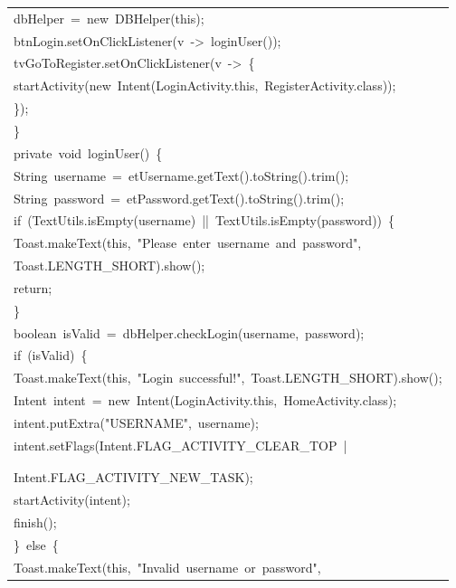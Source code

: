 \documentclass[a4paper,12pt]{article}
\begin{document}
\begin{longtable}{|p{}|}
{\ttfamily\small dbHelper\ =\ new\ DBHelper(this);} \\
{\ttfamily\small btnLogin.setOnClickListener(v\ -\textgreater{}\ loginUser());} \\
{\ttfamily\small tvGoToRegister.setOnClickListener(v\ -\textgreater{}\ \{} \\
{\ttfamily\small startActivity(new\ Intent(LoginActivity.this,\ RegisterActivity.class));} \\
{\ttfamily\small \});} \\
{\ttfamily\small \}} \\
{\ttfamily\small private\ void\ loginUser()\ \{} \\
{\ttfamily\small String\ username\ =\ etUsername.getText().toString().trim();} \\
{\ttfamily\small String\ password\ =\ etPassword.getText().toString().trim();} \\
{\ttfamily\small if\ (TextUtils.isEmpty(username)\ ||\ TextUtils.isEmpty(password))\ \{} \\
{\ttfamily\small Toast.makeText(this,\ "Please\ enter\ username\ and\ password",} \\
{\ttfamily\small Toast.LENGTH\_SHORT).show();} \\
{\ttfamily\small return;} \\
{\ttfamily\small \}} \\
{\ttfamily\small boolean\ isValid\ =\ dbHelper.checkLogin(username,\ password);} \\
{\ttfamily\small if\ (isValid)\ \{} \\
{\ttfamily\small Toast.makeText(this,\ "Login\ successful!",\ Toast.LENGTH\_SHORT).show();} \\
{\ttfamily\small Intent\ intent\ =\ new\ Intent(LoginActivity.this,\ HomeActivity.class);} \\
{\ttfamily\small intent.putExtra("USERNAME",\ username);} \\
{\ttfamily\small intent.setFlags(Intent.FLAG\_ACTIVITY\_CLEAR\_TOP\ |} \\
\strut \\
\strut \\
{\ttfamily\small Intent.FLAG\_ACTIVITY\_NEW\_TASK);} \\
{\ttfamily\small startActivity(intent);} \\
{\ttfamily\small finish();} \\
{\ttfamily\small \}\ else\ \{} \\
{\ttfamily\small Toast.makeText(this,\ "Invalid\ username\ or\ password",} \\

\end{longtable}
\end{document}
